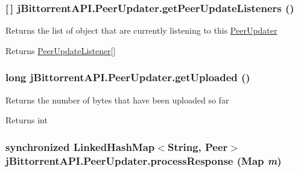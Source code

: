 \hypertarget{classj_bittorrent_a_p_i_1_1_peer_updater_a63330888bcb78a7ac1b416850652d802}{
\subsubsection[{getPeerUpdateListeners}]{ \mbox{[}$\,$\mbox{]} jBittorrentAPI.PeerUpdater.getPeerUpdateListeners ()}}
\label{classj_bittorrent_a_p_i_1_1_peer_updater_a63330888bcb78a7ac1b416850652d802}
Returns the list of object that are currently listening to this \hyperlink{classj_bittorrent_a_p_i_1_1_peer_updater}{PeerUpdater} \begin{DoxyReturn}{Returns}
\hyperlink{interfacej_bittorrent_a_p_i_1_1_peer_update_listener}{PeerUpdateListener}\mbox{[}\mbox{]} 
\end{DoxyReturn}
\hypertarget{classj_bittorrent_a_p_i_1_1_peer_updater_a4acde85b422ff44758973b2e4aa68329}{
\subsubsection[{getUploaded}]{\setlength{\rightskip}{0pt plus 5cm}long jBittorrentAPI.PeerUpdater.getUploaded ()}}
\label{classj_bittorrent_a_p_i_1_1_peer_updater_a4acde85b422ff44758973b2e4aa68329}
Returns the number of bytes that have been uploaded so far \begin{DoxyReturn}{Returns}
int 
\end{DoxyReturn}
\hypertarget{classj_bittorrent_a_p_i_1_1_peer_updater_ac94613dd370de3f689e8b2a68cea22c9}{
\subsubsection[{processResponse}]{\setlength{\rightskip}{0pt plus 5cm}synchronized LinkedHashMap$<$String, {\bf Peer}$>$ jBittorrentAPI.PeerUpdater.processResponse (Map {\em m})}}
\label{classj_bittorrent_a_p_i_1_1_peer_updater_ac94613dd370de3f689e8b2a68cea22c9}
